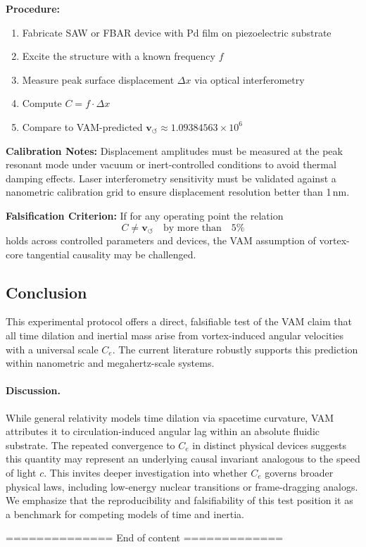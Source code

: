 \documentclass[11pt]{article}
\begin{document}
    \textbf{Procedure:}
    \begin{enumerate}
        \item Fabricate SAW or FBAR device with Pd film on piezoelectric substrate
        \item Excite the structure with a known frequency $f$
        \item Measure peak surface displacement $\Delta x$ via optical interferometry
        \item Compute $C = f \cdot \Delta x$
        \item Compare to VAM-predicted $\mathbf{v}_{\scriptscriptstyle\boldsymbol{\circlearrowleft}} \approx 1.09384563 \times 10^6$\,
    \end{enumerate}

    \textbf{Calibration Notes:} Displacement amplitudes must be measured at the peak resonant mode under vacuum or inert-controlled conditions to avoid thermal damping effects. Laser interferometry sensitivity must be validated against a nanometric calibration grid to ensure displacement resolution better than 1\,nm.

    \textbf{Falsification Criterion:} If for any operating point the relation
    \[
        C \ne \mathbf{v}_{\scriptscriptstyle\boldsymbol{\circlearrowleft}} \quad \text{by more than} \quad 5\%
    \]
    holds across controlled parameters and devices, the VAM assumption of vortex-core tangential causality may be challenged.

    \subsection*{Conclusion}
    This experimental protocol offers a direct, falsifiable test of the VAM claim that all time dilation and inertial mass arise from vortex-induced angular velocities with a universal scale $C_e$. The current literature robustly supports this prediction within nanometric and megahertz-scale systems.

    \paragraph{Discussion.} While general relativity models time dilation via spacetime curvature, VAM attributes it to circulation-induced angular lag within an absolute fluidic substrate. The repeated convergence to $C_e$ in distinct physical devices suggests this quantity may represent an underlying causal invariant analogous to the speed of light $c$. This invites deeper investigation into whether $C_e$ governs broader physical laws, including low-energy nuclear transitions or frame-dragging analogs. We emphasize that the reproducibility and falsifiability of this test position it as a benchmark for competing models of time and inertia.


 ============== End of content =============

\ifdefined\standalonechapter\else


\end{document}
